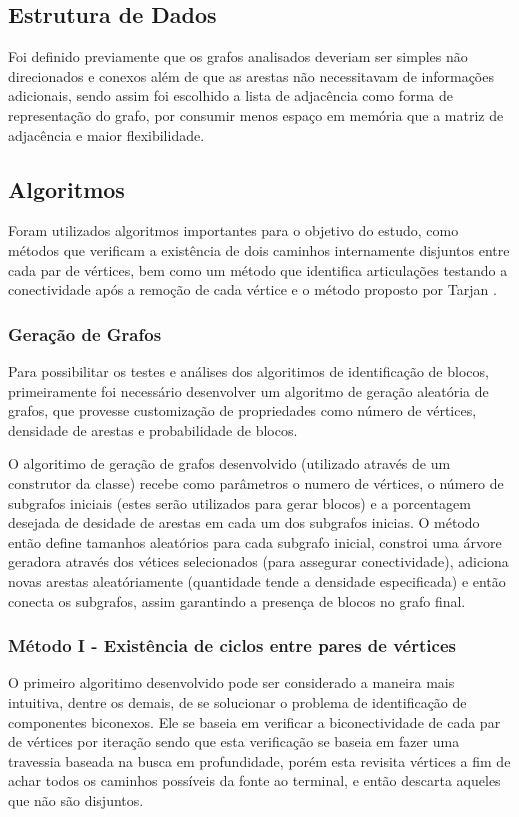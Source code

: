 \subsection{\esp Estrutura de Dados}

Foi definido previamente que os grafos analisados deveriam ser simples não direcionados e conexos além de que as arestas não necessitavam de informações adicionais, sendo assim foi escolhido a lista de adjacência como forma de representação do grafo, por consumir menos espaço em memória que a matriz de adjacência e maior flexibilidade.

\subsection{\esp Algoritmos}

Foram utilizados algoritmos importantes para o objetivo do estudo, como métodos que verificam a existência de dois caminhos internamente disjuntos entre cada par de vértices, bem como um método que identifica articulações testando a conectividade após a remoção de cada vértice e o método proposto por Tarjan \cite{artigo_tarjan}.

\subsubsection{\esp Geração de Grafos}

Para possibilitar os testes e análises dos algoritimos de identificação de blocos, primeiramente foi necessário desenvolver um algoritmo de geração aleatória de grafos, que provesse customização de propriedades como número de vértices, densidade de arestas e probabilidade de blocos.

O algoritimo de geração de grafos desenvolvido (utilizado através de um construtor da classe) recebe como parâmetros o numero de vértices, o número de subgrafos iniciais (estes serão utilizados para gerar blocos) e a porcentagem desejada de desidade de arestas em cada um dos subgrafos inicias. O método então define tamanhos aleatórios para cada subgrafo inicial, constroi uma árvore geradora através dos vétices selecionados (para assegurar conectividade), adiciona novas arestas aleatóriamente (quantidade tende a densidade especificada) e então conecta os subgrafos, assim garantindo a presença de blocos no grafo final.

\subsubsection{\esp Método I - Existência de ciclos entre pares de vértices}
\label{method_I}
O primeiro algoritimo desenvolvido pode ser considerado a maneira mais intuitiva, dentre os demais, de se solucionar o problema de identificação de componentes biconexos. Ele se baseia em verificar a biconectividade de cada par de vértices por iteração sendo que esta verificação se baseia em fazer uma travessia baseada na busca em profundidade, porém esta revisita vértices a fim de achar todos os caminhos possíveis da fonte ao terminal, e então descarta aqueles que não são disjuntos.

